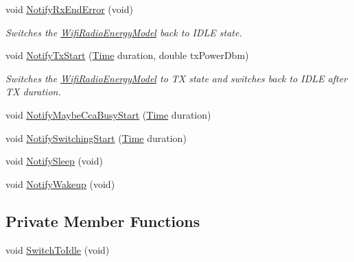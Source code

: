 \begin{DoxyCompactItemize}
void \hyperlink{classns3_1_1WifiRadioEnergyModelPhyListener_ae570c25232dcd13943a12cefd961c942}{Notify\+Rx\+End\+Error} (void)
\begin{DoxyCompactList}\small\item\em Switches the \hyperlink{classns3_1_1WifiRadioEnergyModel}{Wifi\+Radio\+Energy\+Model} back to I\+D\+LE state. \end{DoxyCompactList}\item 
void \hyperlink{classns3_1_1WifiRadioEnergyModelPhyListener_ade41c617c080373e5a62696ddd34ccf0}{Notify\+Tx\+Start} (\hyperlink{classns3_1_1Time}{Time} duration, double tx\+Power\+Dbm)
\begin{DoxyCompactList}\small\item\em Switches the \hyperlink{classns3_1_1WifiRadioEnergyModel}{Wifi\+Radio\+Energy\+Model} to TX state and switches back to I\+D\+LE after TX duration. \end{DoxyCompactList}\item 
void \hyperlink{classns3_1_1WifiRadioEnergyModelPhyListener_a06715f4a2ea8cc968eac8f8a7f8f720b}{Notify\+Maybe\+Cca\+Busy\+Start} (\hyperlink{classns3_1_1Time}{Time} duration)
\item 
void \hyperlink{classns3_1_1WifiRadioEnergyModelPhyListener_ad30c8e743b3fa0fc1abc2e9d20c0eacb}{Notify\+Switching\+Start} (\hyperlink{classns3_1_1Time}{Time} duration)
\item 
void \hyperlink{classns3_1_1WifiRadioEnergyModelPhyListener_a7738292d3a300a21eb3d632fa18cdd02}{Notify\+Sleep} (void)
\item 
void \hyperlink{classns3_1_1WifiRadioEnergyModelPhyListener_ae27dfb6f063d5ad578746b7c0677a511}{Notify\+Wakeup} (void)
\end{DoxyCompactItemize}
\subsection*{Private Member Functions}
\begin{DoxyCompactItemize}
\item 
void \hyperlink{classns3_1_1WifiRadioEnergyModelPhyListener_a8b9bee042c268ee5c53a594c7faa2d96}{Switch\+To\+Idle} (void)
\end{DoxyCompactItemize}
